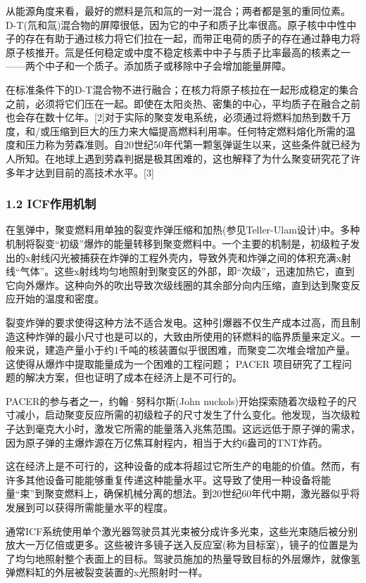 从能源角度来看，最好的燃料是氘和氚的一对一混合；两者都是氢的重同位素。D-T(氘和氚)混合物的屏障很低，因为它的中子和质子比率很高。原子核中中性中子的存在有助于通过核力将它们拉在一起，而带正电荷的质子的存在通过静电力将原子核推开。氚是任何稳定或中度不稳定核素中中子与质子比率最高的核素之一——两个中子和一个质子。添加质子或移除中子会增加能量屏障。

在标准条件下的D-T混合物不进行融合；在核力将原子核拉在一起形成稳定的集合之前，必须将它们压在一起。即使在太阳炎热、密集的中心，平均质子在融合之前也会存在数十亿年。[2]对于实际的聚变发电系统，必须通过将燃料加热到数千万度，和/或压缩到巨大的压力来大幅提高燃料利用率。任何特定燃料熔化所需的温度和压力称为劳森准则。自20世纪50年代第一颗氢弹诞生以来，这些条件就已经为人所知。在地球上遇到劳森判据是极其困难的，这也解释了为什么聚变研究花了许多年才达到目前的高技术水平。[3]
\subsubsection{1.2 ICF作用机制}
在氢弹中，聚变燃料用单独的裂变炸弹压缩和加热(参见Teller-Ulam设计)中。多种机制将裂变“初级”爆炸的能量转移到聚变燃料中。一个主要的机制是，初级粒子发出的x射线闪光被捕获在炸弹的工程外壳内，导致外壳和炸弹之间的体积充满x射线“气体”。这些x射线均匀地照射到聚变区的外部，即“次级”，迅速加热它，直到它向外爆炸。这种向外的吹出导致次级线圈的其余部分向内压缩，直到达到聚变反应开始的温度和密度。

裂变炸弹的要求使得这种方法不适合发电。这种引爆器不仅生产成本过高，而且制造这种炸弹的最小尺寸也是可以的，大致由所使用的钚燃料的临界质量来定义。一般来说，建造产量小于约1千吨的核装置似乎很困难，而聚变二次堆会增加产量。这使得从爆炸中提取能量成为一个困难的工程问题； PACER 项目研究了工程问题的解决方案，但也证明了成本在经济上是不可行的。

PACER的参与者之一，约翰·努科尔斯(John nuckols)开始探索随着次级粒子的尺寸减小，启动聚变反应所需的初级粒子的尺寸发生了什么变化。他发现，当次级粒子达到毫克大小时，激发它所需的能量落入兆焦范围。这远远低于原子弹的需求，因为原子弹的主爆炸源在万亿焦耳射程内，相当于大约6盎司的TNT炸药。

这在经济上是不可行的，这种设备的成本将超过它所生产的电能的价值。然而，有许多其他设备可能能够重复传递这种能量水平。这导致了使用一种设备将能量“束”到聚变燃料上，确保机械分离的想法。到20世纪60年代中期，激光器似乎将发展到可以获得所需能量水平的程度。

通常ICF系统使用单个激光器驾驶员其光束被分成许多光束，这些光束随后被分别放大一万亿倍或更多。这些被许多镜子送入反应室(称为目标室)，镜子的位置是为了均匀地照射整个表面上的目标。驾驶员施加的热量导致目标的外层爆炸，就像氢弹燃料缸的外层被裂变装置的x光照射时一样。

